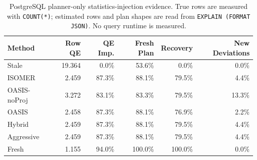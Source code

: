 \begin{table}[t]
  \centering
  \small
  \caption{PostgreSQL planner-only statistics-injection evidence. True rows are measured with \texttt{COUNT(*)}; estimated rows and plan shapes are read from \texttt{EXPLAIN (FORMAT JSON)}. No query runtime is measured.}
  \label{tab:postgres_planner_stats_injection}
  \setlength{\tabcolsep}{4pt}
  \begin{tabular}{lrrrrr}
    \toprule
    Method & Row QE & QE Imp. & Fresh Plan & Recovery & New Deviations \\
    \midrule
    Stale & 19.364 & 0.0\% & 53.6\% & 0.0\% & 0.0\% \\
    ISOMER & 2.459 & 87.3\% & 88.1\% & 79.5\% & 4.4\% \\
    OASIS-noProj & 3.272 & 83.1\% & 83.3\% & 79.5\% & 13.3\% \\
    OASIS & 2.458 & 87.3\% & 88.1\% & 76.9\% & 2.2\% \\
    Hybrid & 2.459 & 87.3\% & 88.1\% & 79.5\% & 4.4\% \\
    Aggressive & 2.459 & 87.3\% & 88.1\% & 79.5\% & 4.4\% \\
    Fresh & 1.155 & 94.0\% & 100.0\% & 100.0\% & 0.0\% \\
    \bottomrule
  \end{tabular}
\end{table}
